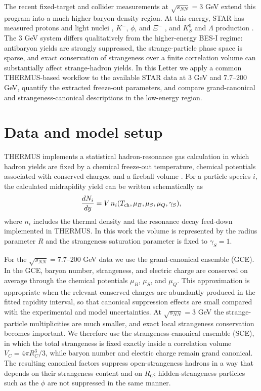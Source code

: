 \documentclass[preprint,12pt]{elsarticle}
\begin{document}
The recent fixed-target and collider measurements at $\sqrt{s_{NN}}=3$ GeV extend this program into a much higher baryon-density region.
At this energy, STAR has measured protons and light nuclei \cite{STARLightNuclei3GeV}, $K^-$, $\phi$, and $\Xi^-$ \cite{STARKPhiXi3GeV}, and $K^0_S$ and $\Lambda$ production \cite{STARKsLambda3GeV}.
The 3 GeV system differs qualitatively from the higher-energy BES-I regime: antibaryon yields are strongly suppressed, the strange-particle phase space is sparse, and exact conservation of strangeness over a finite correlation volume can substantially affect strange-hadron yields.
In this Letter we apply a common THERMUS-based workflow to the available STAR data at 3 GeV and 7.7--200 GeV, quantify the extracted freeze-out parameters, and compare grand-canonical and strangeness-canonical descriptions in the low-energy region.

\section{Data and model setup}

THERMUS implements a statistical hadron-resonance gas calculation in which hadron yields are fixed by a chemical freeze-out temperature, chemical potentials associated with conserved charges, and a fireball volume \cite{Wheaton2009THERMUS}.
For a particle species $i$, the calculated midrapidity yield can be written schematically as
\begin{equation}
\frac{dN_i}{dy} = V \, n_i(T_{\rm ch},\mu_B,\mu_S,\mu_Q,\gamma_S),
\end{equation}
where $n_i$ includes the thermal density and the resonance decay feed-down implemented in THERMUS.
In this work the volume is represented by the radius parameter $R$ and the strangeness saturation parameter is fixed to $\gamma_S=1$.

For the $\sqrt{s_{NN}}=7.7$--200 GeV data we use the grand-canonical ensemble (GCE).
In the GCE, baryon number, strangeness, and electric charge are conserved on average through the chemical potentials $\mu_B$, $\mu_S$, and $\mu_Q$.
This approximation is appropriate when the relevant conserved charges are abundantly produced in the fitted rapidity interval, so that canonical suppression effects are small compared with the experimental and model uncertainties.
At $\sqrt{s_{NN}}=3$ GeV the strange-particle multiplicities are much smaller, and exact local strangeness conservation becomes important.
We therefore use the strangeness-canonical ensemble (SCE), in which the total strangeness is fixed exactly inside a correlation volume $V_C=4\pi R_C^3/3$, while baryon number and electric charge remain grand canonical.
The resulting canonical factors suppress open-strangeness hadrons in a way that depends on their strangeness content and on $R_C$; hidden-strangeness particles such as the $\phi$ are not suppressed in the same manner.
\end{document}
